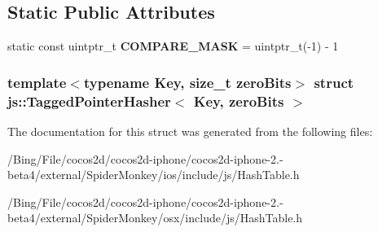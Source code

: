 \subsection*{Static Public Attributes}
\begin{DoxyCompactItemize}
\item 
\hypertarget{structjs_1_1_tagged_pointer_hasher_a9a8ee362391859237a1530c3491c80f1}{static const uintptr\-\_\-t {\bfseries C\-O\-M\-P\-A\-R\-E\-\_\-\-M\-A\-S\-K} = uintptr\-\_\-t(-\/1) -\/ 1}\label{structjs_1_1_tagged_pointer_hasher_a9a8ee362391859237a1530c3491c80f1}

\end{DoxyCompactItemize}
\subsubsection*{template$<$typename Key, size\-\_\-t zero\-Bits$>$ struct js\-::\-Tagged\-Pointer\-Hasher$<$ Key, zero\-Bits $>$}



The documentation for this struct was generated from the following files\-:\begin{DoxyCompactItemize}
\item 
/\-Bing/\-File/cocos2d/cocos2d-\/iphone/cocos2d-\/iphone-\/2.-\/beta4/external/\-Spider\-Monkey/ios/include/js/Hash\-Table.\-h\item 
/\-Bing/\-File/cocos2d/cocos2d-\/iphone/cocos2d-\/iphone-\/2.-\/beta4/external/\-Spider\-Monkey/osx/include/js/Hash\-Table.\-h\end{DoxyCompactItemize}
